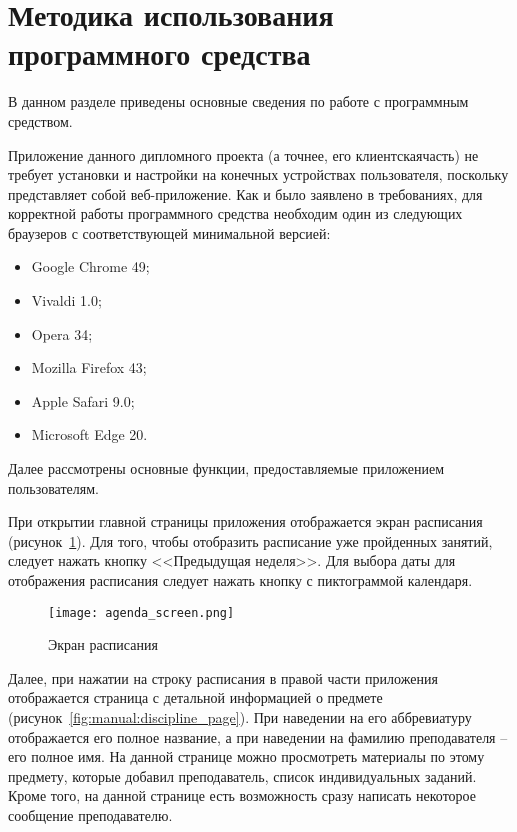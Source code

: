 \section{Методика использования программного средства}
\label{sec:manual}

В данном разделе приведены основные сведения по работе с программным средством.

Приложение данного дипломного проекта (а точнее, его клиентская\linebreak часть) не требует установки и настройки на конечных устройствах пользователя, поскольку представляет собой веб-приложение. Как и было заявлено в требованиях, для корректной работы программного средства необходим один из следующих браузеров с соответствующей минимальной версией:
\begin{itemize}
	\item Google Chrome 49;
	\item Vivaldi 1.0;
	\item Opera 34;
	\item Mozilla Firefox 43;
	\item Apple Safari 9.0;
	\item Microsoft Edge 20.
\end{itemize}

Далее рассмотрены основные функции, предоставляемые приложением пользователям.

При открытии главной страницы приложения отображается экран расписания (рисунок~\ref{fig:manual:agenda_screen}). Для того, чтобы отобразить расписание уже пройденных занятий, следует нажать кнопку <<Предыдущая неделя>>. Для выбора даты для отображения расписания следует нажать кнопку с пиктограммой календаря.

\begin{figure}[ht]
\centering
	\texttt{[image: agenda\_screen.png]}
	\caption{Экран расписания}
	\label{fig:manual:agenda_screen}
\end{figure}

Далее, при нажатии на строку расписания в правой части приложения отображается страница с детальной информацией о предмете (рисунок~\ref{fig:manual:discipline_page}). При наведении на его аббревиатуру отображается его полное название, а при наведении на фамилию преподавателя -- его полное имя. На данной странице можно просмотреть материалы по этому предмету, которые добавил преподаватель, список индивидуальных заданий. Кроме того, на данной странице есть возможность сразу написать некоторое сообщение преподавателю.

